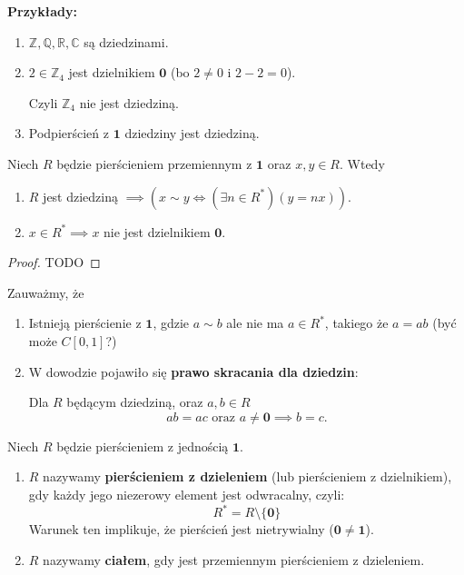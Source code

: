 \noindent \textbf{Przykłady:}
\begin{enumerate}[label=\arabic*)]
	\item $\mathbb{Z}, \mathbb{Q} , \mathbb{R} , \mathbb{C} $ są dziedzinami.
	\item $2\in \mathbb{Z} _{4}$ jest dzielnikiem $\mathbf{0}$ (bo $2\neq 0$ i $2-2=0$).

		Czyli $\mathbb{Z}_{4}$ nie jest dziedziną. 
	\item Podpierścień z $\mathbf{1}$ dziedziny jest dziedziną.
\end{enumerate}
\begin{fact}
	Niech $R$ będzie pierścieniem przemiennym z $\mathbf{1}$ oraz $x,y \in R$. Wtedy
	\begin{enumerate}[label=\arabic*)]
		\item $R$ jest dziedziną $\implies \left( x\sim y \iff \left(\exists n \in R^{\ast}  \right)\left( y = nx \right)   \right) $.
		\item $x\in R^{\ast} \implies x$ nie jest dzielnikiem $\mathbf{0}$.
	\end{enumerate}
\end{fact}
\begin{proof}
	TODO
\end{proof} 
\begin{remark}
	Zauważmy, że
	\begin{enumerate}[label=\arabic*)]
		\item Istnieją pierścienie z $\mathbf{1}$, gdzie $a\sim b$ ale nie ma $a\in R^{\ast} $, takiego że $a=ab$ (być może  $C\left[ 0,1 \right] $?)
		\item W dowodzie pojawiło się \textbf{prawo skracania dla dziedzin}:

			Dla $R$ będącym dziedziną, oraz $a,b \in R$ 
			\[
			ab = ac\text{ oraz }a\neq \mathbf{0}\implies b = c
			.\] 
	\end{enumerate}
\end{remark} 

\begin{definition}
    Niech $R$ będzie pierścieniem z jednością $\mathbf{1}$.
    \begin{enumerate}[label=\arabic*)]
        \item $R$ nazywamy \textbf{pierścieniem z dzieleniem} (lub pierścieniem z dzielnikiem), gdy każdy jego niezerowy element jest odwracalny, czyli:
        \[ R^{\ast} = R \setminus \{\mathbf{0}\} \]
        Warunek ten implikuje, że pierścień jest nietrywialny ($\mathbf{0} \neq \mathbf{1}$).
        \item $R$ nazywamy \textbf{ciałem}, gdy jest przemiennym pierścieniem z dzieleniem.
    \end{enumerate}
\end{definition}


